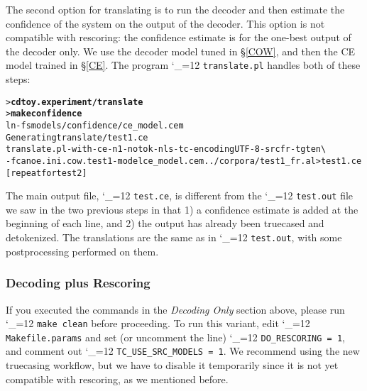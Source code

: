 \documentclass[11pt,letterpaper]{article}
\newcommand{\bs}{\textbackslash{}}
\def\code{\begingroup\catcode`\_=12 \codex}
\newcommand{\codex}[1]{\texttt{#1}\endgroup}
\begin{document}
The second option for translating is to run the decoder and then estimate the
confidence of the system on the output of the decoder.  This option is not
compatible with rescoring: the confidence estimate is for the one-best output
of the decoder only.  We use the decoder model tuned in \S\ref{COW}, and
then the CE model trained in \S\ref{CE}.  The program
\code{translate.pl} handles both of these steps:
\begin{small}
\begin{alltt}
   > \textbf{cd toy.experiment/translate}
   > \textbf{make confidence}
   ln -fs models/confidence/ce_model.cem
   Generating translate/test1.ce
   translate.pl -with-ce -n 1 -notok -nl s -tc -encoding UTF-8 -src fr -tgt en \bs
      -f canoe.ini.cow.test1 -model ce_model.cem ../corpora/test1_fr.al > test1.ce
   [repeat for test2]
\end{alltt}
\end{small}
The main output file, \code{test.ce}, is different from the \code{test.out}
file we saw in the two previous steps in that 1) a confidence estimate is added
at the beginning of each line, and 2) the output has already been
truecased and detokenized. The translations are the same as in
\code{test.out}, with some postprocessing performed on them.

\subsubsection{Decoding plus Rescoring} \label{RATTrans}

If you executed the commands in the \emph{Decoding Only} section above, please
run \code{make clean} before proceeding.  To run this variant, edit
\code{Makefile.params} and set (or uncomment the line) \code{DO_RESCORING = 1},
and comment out \code{TC_USE_SRC_MODELS = 1}.  We recommend using the new
truecasing workflow, but we have to disable it temporarily since it is not yet
compatible with rescoring, as we mentioned before.
\end{document}
